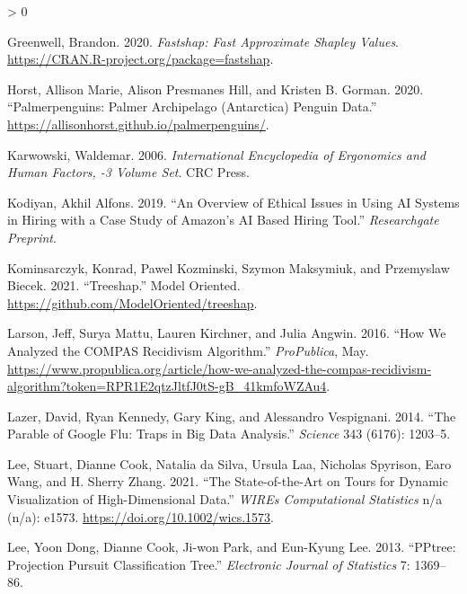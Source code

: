 \documentclass[
  article]{article}
\newlength{\cslhangindent}
\newenvironment{CSLReferences}[2] %
 {%
  \setlength{\parindent}{0pt}
  \ifodd #1 \everypar{\setlength{\hangindent}{\cslhangindent}}\ignorespaces\fi
  \ifnum #2 > 0
  \setlength{\parskip}{#2\baselineskip}
  \fi
 }%
 {}
\begin{document}
\begin{CSLReferences}{1}{0}
\leavevmode\hypertarget{ref-greenwell_fastshap_2020}{}%
Greenwell, Brandon. 2020. \emph{Fastshap: {Fast} {Approximate} {Shapley} {Values}}. \url{https://CRAN.R-project.org/package=fastshap}.

\leavevmode\hypertarget{ref-horst_palmerpenguins_2020}{}%
Horst, Allison Marie, Alison Presmanes Hill, and Kristen B. Gorman. 2020. {``Palmerpenguins: {Palmer} {Archipelago} ({Antarctica}) Penguin Data.''} \url{https://allisonhorst.github.io/palmerpenguins/}.

\leavevmode\hypertarget{ref-karwowski_international_2006}{}%
Karwowski, Waldemar. 2006. \emph{International {Encyclopedia} of {Ergonomics} and {Human} {Factors}, -3 {Volume} {Set}}. CRC Press.

\leavevmode\hypertarget{ref-kodiyan_overview_2019}{}%
Kodiyan, Akhil Alfons. 2019. {``An Overview of Ethical Issues in Using {AI} Systems in Hiring with a Case Study of {Amazon}'s {AI} Based Hiring Tool.''} \emph{Researchgate Preprint}.

\leavevmode\hypertarget{ref-kominsarczyk_treeshap_2021}{}%
Kominsarczyk, Konrad, Pawel Kozminski, Szymon Maksymiuk, and Przemyslaw Biecek. 2021. {``Treeshap.''} Model Oriented. \url{https://github.com/ModelOriented/treeshap}.

\leavevmode\hypertarget{ref-larson_how_2016}{}%
Larson, Jeff, Surya Mattu, Lauren Kirchner, and Julia Angwin. 2016. {``How {We} {Analyzed} the {COMPAS} {Recidivism} {Algorithm}.''} \emph{ProPublica}, May. \url{https://www.propublica.org/article/how-we-analyzed-the-compas-recidivism-algorithm?token=RPR1E2qtzJltfJ0tS-gB_41kmfoWZAu4}.

\leavevmode\hypertarget{ref-lazer_parable_2014}{}%
Lazer, David, Ryan Kennedy, Gary King, and Alessandro Vespignani. 2014. {``The Parable of {Google} {Flu}: Traps in Big Data Analysis.''} \emph{Science} 343 (6176): 1203--5.

\leavevmode\hypertarget{ref-lee_state_2021}{}%
Lee, Stuart, Dianne Cook, Natalia da Silva, Ursula Laa, Nicholas Spyrison, Earo Wang, and H. Sherry Zhang. 2021. {``The State-of-the-Art on Tours for Dynamic Visualization of High-Dimensional Data.''} \emph{WIREs Computational Statistics} n/a (n/a): e1573. \url{https://doi.org/10.1002/wics.1573}.

\leavevmode\hypertarget{ref-lee_pptree_2013}{}%
Lee, Yoon Dong, Dianne Cook, Ji-won Park, and Eun-Kyung Lee. 2013. {``{PPtree}: {Projection} Pursuit Classification Tree.''} \emph{Electronic Journal of Statistics} 7: 1369--86.


\end{CSLReferences}
\end{document}
